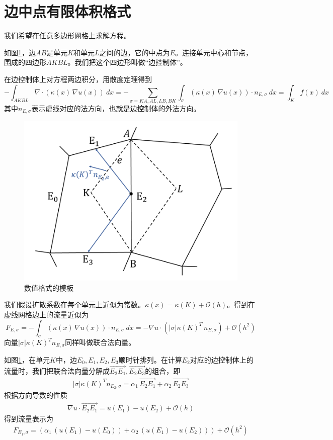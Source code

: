 \documentclass[12pt,a4paper]{article}
\theoremstyle{plain}
\begin{document}
\section*{边中点有限体积格式}

我们希望在任意多边形网格上求解方程。

如图\ref{f1}，边$AB$是单元$K$和单元$L$之间的边，它的中点为$E$。连接单元中心和节点，围成的四边形$AKBL$。我们把这个四边形叫做“边控制体”。

在边控制体上对方程两边积分，用散度定理得到
\begin{equation*}
- \int_{AKBL} \nabla \cdot (\kappa(x) \, \nabla u(x)) \ dx = - \sum_{\sigma = KA, AL, LB, BK} \int_{\sigma} (\kappa(x) \, \nabla u(x)) \cdot n_{E, \sigma} \ dx = \int_{K} f(x) \ dx
\end{equation*}
其中$n_{E, \sigma}$表示虚线对应的法方向，也就是边控制体的外法方向。

\begin{figure}[h]
\centering
\includegraphics[width=0.5\linewidth]{stencil.png}
\caption{数值格式的模板}
\label{f1}
\end{figure}

我们假设扩散系数在每个单元上近似为常数。$\kappa(x) = \kappa(K) + \mathcal{O}(h)$。得到在虚线网格边上的流量近似为
\begin{equation*}
F_{E, \sigma} = - \int_{\sigma} (\kappa(x) \, \nabla u(x)) \cdot n_{E, \sigma} \ dx = - \nabla u \cdot (|\sigma| \kappa(K)^T \, n_{E, \sigma}) + \mathcal{O}(h^2)
\end{equation*}
向量$|\sigma| \kappa(K)^T n_{E, \sigma}$同样叫做联合法向量。

如图\ref{f1}，在单元$K$中，边$E_0,E_1,E_2,E_3$顺时针排列。在计算$E_2$对应的边控制体上的流量时，我们把联合法向量分解成$\overrightarrow{E_2 E_1}, \overrightarrow{E_2 E_3}$的组合，即
\begin{align*}
|\sigma| \kappa(K)^T n_{E_2, \sigma} = \alpha_1 \, \overrightarrow{E_2 E_1} + \alpha_2 \, \overrightarrow{E_2 E_3}
\end{align*}
根据方向导数的性质
\begin{align*}
\nabla u \cdot \overrightarrow{E_2 E_1} = u(E_1) - u(E_2) + \mathcal{O}(h)
\end{align*}
得到流量表示为
\begin{align*}
F_{E_1, \sigma} = (\alpha_{1} \, (u(E_1) - u(E_0)) + \alpha_{2} \, (u(E_1) - u(E_2))) + \mathcal{O}(h^2)
\end{align*}
\end{document}
